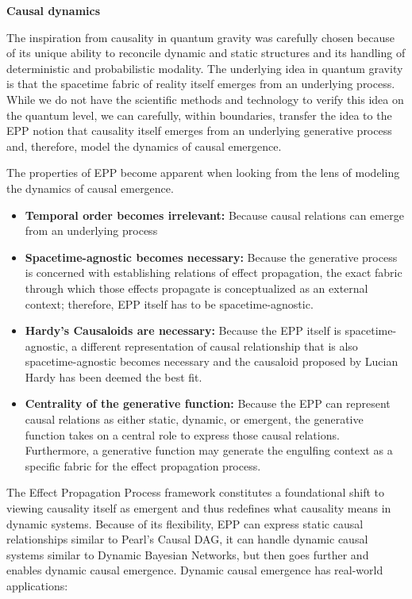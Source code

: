 \documentclass{article}
\begin{document}
\textbf{Causal dynamics}

The inspiration from causality in quantum gravity was carefully chosen because of its unique ability to reconcile dynamic and static structures and its handling of deterministic and probabilistic modality. The underlying idea in quantum gravity is that the spacetime fabric of reality itself emerges from an underlying process. While we do not have the scientific methods and technology to verify this idea on the quantum level, we can carefully, within boundaries, transfer the idea to the EPP notion that causality itself emerges from an underlying generative process and, therefore, model the dynamics of causal emergence.

The properties of EPP become apparent when looking from the lens of modeling the dynamics of causal emergence.

\begin{itemize}
    \item \textbf{Temporal order becomes irrelevant:} Because causal relations can emerge from an underlying process
    \item \textbf{Spacetime-agnostic becomes necessary:} Because the generative process is concerned with establishing relations of effect propagation, the exact fabric through which those effects propagate is conceptualized as an external context; therefore, EPP itself has to be spacetime-agnostic.
    \item \textbf{Hardy's Causaloids are necessary:} Because the EPP itself is spacetime-agnostic, a different representation of causal relationship that is also spacetime-agnostic becomes necessary and the causaloid proposed by Lucian Hardy has been deemed the best fit.
    \item \textbf{Centrality of the generative function:} Because the EPP can represent causal relations as either static, dynamic, or emergent, the generative function takes on a central role to express those causal relations. Furthermore, a generative function may generate the engulfing context as a specific fabric for the effect propagation process.
\end{itemize}


The Effect Propagation Process framework constitutes a  foundational shift to viewing causality itself as emergent and thus redefines what causality means in dynamic systems. Because of its flexibility, EPP can express static causal relationships similar to Pearl’s Causal DAG, it can handle dynamic causal systems similar to Dynamic Bayesian Networks, but then goes further and enables dynamic causal emergence. Dynamic causal emergence has real-world applications:
\end{document}
